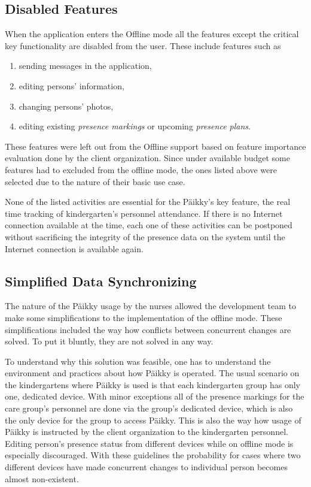 \subsection{Disabled Features}
When the application enters the Offline mode all the features except the critical key functionality are disabled from the user. These include features such as

\begin{enumerate}
    \item sending messages in the application,
    \item editing persons' information,
    \item changing persons' photos,
    \item editing existing \textit{presence markings} or upcoming \textit{presence plans}.
\end{enumerate}

These features were left out from the Offline support based on feature importance evaluation done by the client organization. Since under available budget some features had to excluded from the offline mode, the ones listed above were selected due to the nature of their basic use case.

None of the listed activities are essential for the Päikky's key feature, the real time tracking of kindergarten's personnel attendance. If there is no Internet connection available at the time, each one of these activities can be postponed without sacrificing the integrity of the presence data on the system until the Internet connection is available again.




\subsection{Simplified Data Synchronizing}
The nature of the Päikky usage by the nurses allowed the development team to make some simplifications to the implementation of the offline mode. These simplifications included the way how conflicts between concurrent changes are solved. To put it bluntly, they are not solved in any way.

To understand why this solution was feasible, one has to understand the environment and practices about how Päikky is operated. The usual scenario on the kindergartens where Päikky is used is that each kindergarten group has only one, dedicated device. With minor exceptions all of the presence markings for the care group's personnel are done via the group's dedicated device, which is also the only device for the group to access Päikky. This is also the way how usage of Päikky is instructed by the client organization to the kindergarten personnel. Editing person's presence status from different devices while on offline mode is especially discouraged. With these guidelines the probability for cases where two different devices have made concurrent changes to individual person becomes almost non-existent. 

